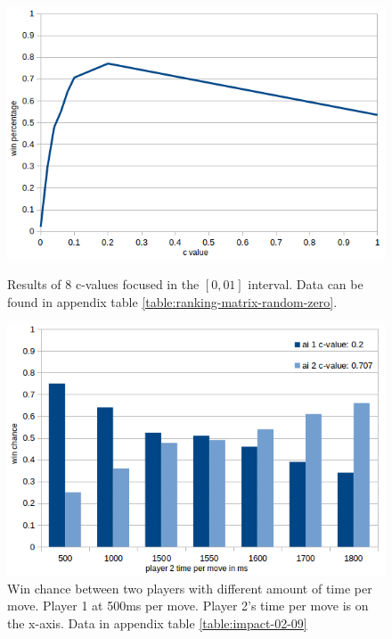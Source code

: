 \documentclass[
11pt, %
english, %
singlespacing, %
headsepline, %
]{MastersDoctoralThesis} %
\begin{document}
\vfill
\pagebreak
\begin{figure}[h]
	\captionsetup{width=.45\textwidth}
	\begin{minipage}[t]{0.49\textwidth}
		\centering
		\includegraphics[width=\textwidth]{images/rank-0-01}
		\caption{Results of 8 c-values focused in the $[0,01]$ interval. Data can be found in appendix table \ref{table:ranking-matrix-random-zero}.}
		\label{fig:results-rank-0-01}
	\end{minipage}
	\begin{minipage}[t]{0.49\textwidth}
		\centering
		\includegraphics[width=\textwidth]{images/mcts-significance}
		\caption{Win chance between two players with different amount of time per move. Player 1 at 500ms per move. Player 2's time per move is on the x-axis. Data in appendix table \ref{table:impact-02-09}}
		\label{fig:mcts-significance}
	\end{minipage}
\end{figure}
\end{document}
